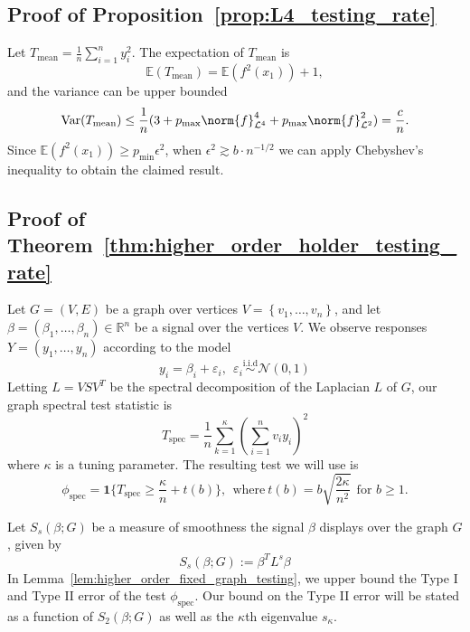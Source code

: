 \documentclass{article}
\newcommand{\Reals}{\mathbb{R}}
\newcommand{\set}[1]{\left\{#1\right\}}
\newcommand{\Var}{\mathrm{Var}}
\newcommand{\1}{\mathbf{1}}
\newcommand{\Leb}{\mathcal{L}}
\newcommand{\Ebb}{\mathbb{E}}
\newcommand{\spec}{\mathrm{spec}}
\theoremstyle{alden}
\theoremstyle{aldenthm}
\theoremstyle{definition}
\theoremstyle{remark}
\begin{document}
\subsection{Proof of Proposition~\ref{prop:L4_testing_rate}}

Let $T_{\mathrm{mean}} = \frac{1}{n}\sum_{i = 1}^{n} y_i^2$. The expectation of $T_{\mathrm{mean}}$ is
\begin{equation*}
\Ebb(T_{\mathrm{mean}}) = \mathbb{E}(f^2(x_1)) + 1,
\end{equation*}
and the variance can be upper bounded
\begin{equation*}
\Var(T_{\mathrm{mean}}) \leq \frac{1}{n}(3 + p_{\max} \norm{f}_{\Leb^4}^4 + p_{\max}\norm{f}_{\Leb^2}^2) = \frac{c}{n}.
\end{equation*}
Since $\mathbb{E}(f^2(x_1)) \geq p_{\min} \epsilon^2$, when $\epsilon^2 \gtrsim b\cdot n^{-1/2}$ we can apply Chebyshev's inequality to obtain the claimed result.

\subsection{Proof of Theorem~\ref{thm:higher_order_holder_testing_rate}}

Let $G = (V,E)$ be a graph over vertices $V = \set{v_1,\ldots,v_n}$, and let $\beta = (\beta_1,\ldots,\beta_n) \in \Reals^n$ be a signal over the vertices $V$. We observe responses $Y = (y_1,\ldots,y_n)$ according to the model
\begin{equation*}
y_i = \beta_i + \varepsilon_i, ~~ \varepsilon_i \overset{\textrm{i.i.d}}{\sim} \mathcal{N}(0,1)
\end{equation*}
Letting $L = VSV^T$ be the spectral decomposition of the Laplacian $L$ of $G$, our graph spectral test statistic is 
\begin{equation*}
T_{\spec} = \frac{1}{n}\sum_{k = 1}^{\kappa} \left(\sum_{i = 1}^{n} v_i y_i\right)^2
\end{equation*}
where $\kappa$ is a tuning parameter. The resulting test we will use is
\begin{equation*}
\phi_{\spec} = \1\{T_{\spec} \geq \frac{\kappa}{n} + t(b)\},~~\textrm{where}~ t(b) = b\sqrt{\frac{2\kappa}{n^2}}~~\textrm{for $b \geq 1$.}
\end{equation*}

Let $S_s(\beta;G)$ be a measure of smoothness the signal $\beta$ displays over the graph $G$, given by
\begin{equation*}
S_s(\beta;G) := \beta^T L^s \beta
\end{equation*}
In Lemma~\ref{lem:higher_order_fixed_graph_testing}, we upper bound the Type I and Type II error of the test $\phi_{\spec}$. Our bound on the Type II error will be stated as a function of $S_2(\beta;G)$ as well as the $\kappa$th eigenvalue $s_{\kappa}$.
\end{document}
